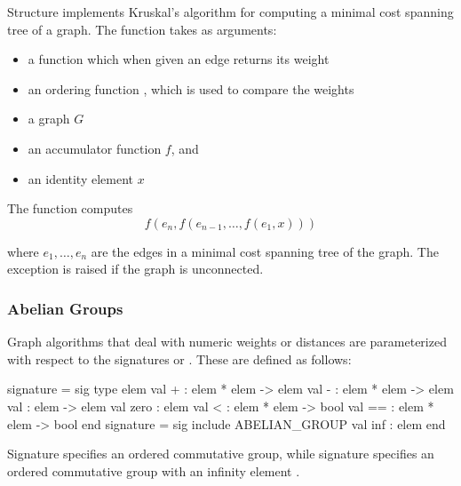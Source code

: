 Structure  implements Kruskal's algorithm for
computing a minimal cost spanning tree of a graph.
The function  takes as arguments:
\begin{itemize}
\item a  function which when given an edge returns its weight
\item an ordering function \sml{<}, which is used to compare the weights
\item a graph $G$
\item an accumulator function $f$, and
\item an identity element $x$
\end{itemize}
The function  computes
\[
   f(e_{n},f(e_{n-1},\ldots, f(e_1,x))) 
\]

where $e_1,\ldots,e_n$ are the edges in a minimal cost spanning tree 
of the graph.
The exception  is raised if the graph is unconnected.

\subsubsection{Abelian Groups}
  Graph algorithms that deal with numeric weights or distances
are parameterized with respect to the signatures
 or .
These are defined as follows:
\begin{SML}
 signature  = sig 
   type elem 
   val +    : elem * elem -> elem
   val -    : elem * elem -> elem
   val      : elem -> elem
   val zero : elem
   val <    : elem * elem -> bool
   val ==   : elem * elem -> bool
 end
 signature  = sig
   include ABELIAN_GROUP
   val inf : elem
 end
\end{SML}
Signature  specifies an ordered commutative group,
while signature  specifies an ordered commutative
group with an infinity element . 

